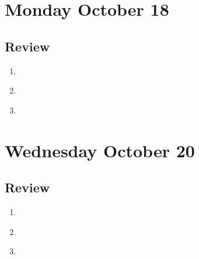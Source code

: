 

\section*{Monday October 18}

\newpage



\newpage

\newpage
\subsection*{Review}
\begin{enumerate}
\item \hspace{1in}\\ 
\item \hspace{1in}\\ 
\item \hspace{1in}\\ 
\end{enumerate}

\newpage
\section*{Wednesday October 20}


\vfill


\newpage




\newpage
\subsection*{Review}
\begin{enumerate}
\item \hspace{1in}\\ 
\item \hspace{1in}\\ 
\item \hspace{1in}\\ 
\end{enumerate}

